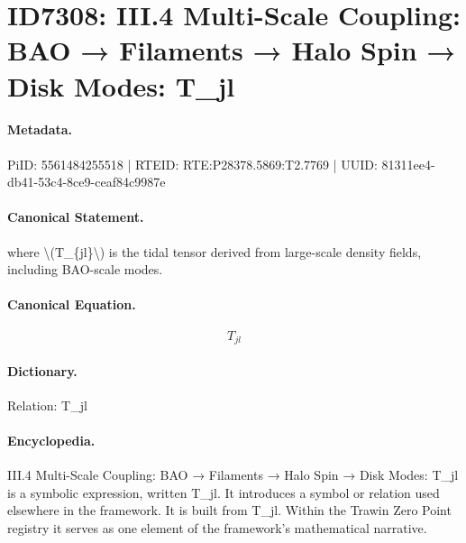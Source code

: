\section*{ID7308: III.4 Multi-Scale Coupling: BAO → Filaments → Halo Spin → Disk Modes: T\_jl}
\paragraph{Metadata.}
PiID: 5561484255518 | RTEID: RTE:P28378.5869:T2.7769 | UUID: 81311ee4-db41-53c4-8ce9-ceaf84c9987e

\paragraph{Canonical Statement.}
where \textbackslash{}(T\_\{jl\}\textbackslash{}) is the tidal tensor derived from large-scale density fields, including BAO-scale modes.

\paragraph{Canonical Equation.}
\[
T_{jl}
\]

\paragraph{Dictionary.}
Relation: T\_jl

\paragraph{Encyclopedia.}
III.4 Multi-Scale Coupling: BAO → Filaments → Halo Spin → Disk Modes: T\_jl is a symbolic expression, written T\_jl. It introduces a symbol or relation used elsewhere in the framework. It is built from T\_jl. Within the Trawin Zero Point registry it serves as one element of the framework's mathematical narrative.
